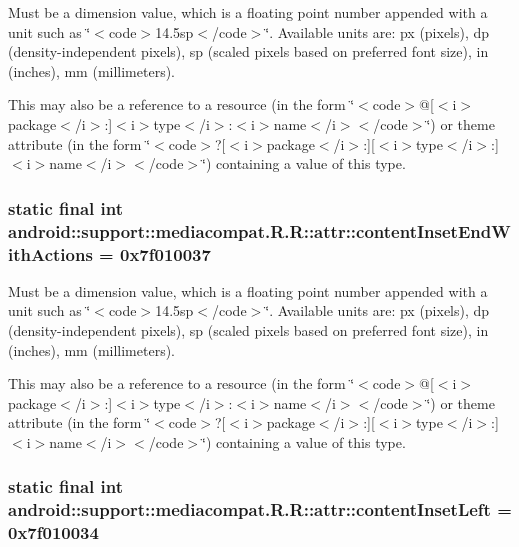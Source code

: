 Must be a dimension value, which is a floating point number appended with a unit such as \char`\"{}$<$code$>$14.5sp$<$/code$>$\char`\"{}. Available units are: px (pixels), dp (density-independent pixels), sp (scaled pixels based on preferred font size), in (inches), mm (millimeters). 

This may also be a reference to a resource (in the form \char`\"{}$<$code$>$@\mbox{[}$<$i$>$package$<$/i$>$:\mbox{]}$<$i$>$type$<$/i$>$:$<$i$>$name$<$/i$>$$<$/code$>$\char`\"{}) or theme attribute (in the form \char`\"{}$<$code$>$?\mbox{[}$<$i$>$package$<$/i$>$:\mbox{]}\mbox{[}$<$i$>$type$<$/i$>$:\mbox{]}$<$i$>$name$<$/i$>$$<$/code$>$\char`\"{}) containing a value of this type. \hypertarget{classandroid_1_1support_1_1mediacompat_1_1_r_1_1attr_af3125f798dd5232bf8387a0a3e19dce}{
\subsubsection[{contentInsetEndWithActions}]{\setlength{\rightskip}{0pt plus 5cm}static final int android::support::mediacompat.R.R::attr::contentInsetEndWithActions = 0x7f010037}}
\label{classandroid_1_1support_1_1mediacompat_1_1_r_1_1attr_af3125f798dd5232bf8387a0a3e19dce}


Must be a dimension value, which is a floating point number appended with a unit such as \char`\"{}$<$code$>$14.5sp$<$/code$>$\char`\"{}. Available units are: px (pixels), dp (density-independent pixels), sp (scaled pixels based on preferred font size), in (inches), mm (millimeters). 

This may also be a reference to a resource (in the form \char`\"{}$<$code$>$@\mbox{[}$<$i$>$package$<$/i$>$:\mbox{]}$<$i$>$type$<$/i$>$:$<$i$>$name$<$/i$>$$<$/code$>$\char`\"{}) or theme attribute (in the form \char`\"{}$<$code$>$?\mbox{[}$<$i$>$package$<$/i$>$:\mbox{]}\mbox{[}$<$i$>$type$<$/i$>$:\mbox{]}$<$i$>$name$<$/i$>$$<$/code$>$\char`\"{}) containing a value of this type. \hypertarget{classandroid_1_1support_1_1mediacompat_1_1_r_1_1attr_bd612bc21f3c5215061a63de58546da3}{
\subsubsection[{contentInsetLeft}]{\setlength{\rightskip}{0pt plus 5cm}static final int android::support::mediacompat.R.R::attr::contentInsetLeft = 0x7f010034}}
\label{classandroid_1_1support_1_1mediacompat_1_1_r_1_1attr_bd612bc21f3c5215061a63de58546da3}


